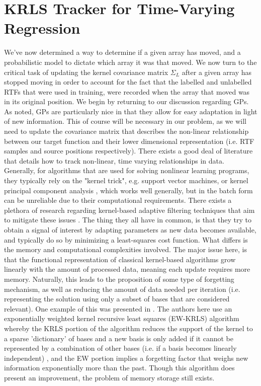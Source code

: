 \documentclass{article}
\begin{document}
 

\section{KRLS Tracker for Time-Varying Regression}
We've now determined a way to determine if a given array has moved, and a probabilistic model to dictate which array it was that moved. We now turn to the critical task of updating the kernel covariance matrix $\Sigma_L$ after a given array has stopped moving in order to account for the fact that the labelled and unlabelled RTFs that were used in training, were recorded when the array that moved was in its original position. We begin by returning to our discussion regarding GPs. As noted, GPs are particularly nice in that they allow for easy adaptation in light of new information. This of course will be necessary in our problem, as we will need to update the covariance matrix that describes the non-linear relationship between our target function and their lower dimensional representation (i.e. RTF samples and source positions respectively). There exists a good deal of literature that details how to track non-linear, time varying relationships in data. Generally, for algorithms that are used for solving nonlinear learning programs, they typically rely on the "kernel trick", e.g. support vector machines, or kernel principal component analysis \cite{BS_learningKernelsSVMsRegOptBey}, which works well generally, but in the batch form can be unreliable due to their computational requirements. There exists a plethora of research regarding kernel-based adaptive filtering techniques that aim to mitigate these issues \cite{JK_onlineLearningWithKern, YE_kernelRlsAlgorithm, WL_kernelAdpaptiveFilterCompIntro}. The thing they all have in common, is that they try to obtain a signal of interest by adapting parameters as new data becomes available, and typically do so by minimizing a least-squares cost function. What differs is the memory and computational complexities involved. The major issue here, is that the functional representation of classical kernel-based algorithms grow linearly with the amount of processed data, meaning each update requires more memory. Naturally, this leads to the proposition of some type of forgetting mechanism, as well as reducing the amount of data needed per iteration (i.e. representing the solution using only a subset of bases that are considered relevant). One example of this was presented in \cite{WL_kernelAdpaptiveFilterCompIntro}. The authors here use an exponentially weighted kernel recursive least squares (EW-KRLS) algorithm whereby the KRLS portion of the algorithm reduces the support of the kernel to a sparse 'dictionary' of bases and a new basis is only added if it cannot be represented by a combination of other bases (i.e. if a basis becomes linearly independent) \cite{SH_adaptFilterTheory}, and the EW portion implies a forgetting factor that weighs new information exponentially more than the past. Though this algorithm does present an improvement, the problem of memory storage still exists. 
\end{document}
